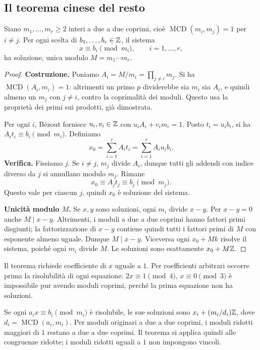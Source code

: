 \subsection{Il teorema cinese del resto}
\begin{teorema}\label{teo:cinese}
Siano $m_1,\ldots,m_r\ge2$ interi a due a due coprimi, cioè $\operatorname{MCD}(m_i,m_j)=1$ per $i\ne j$. Per ogni scelta di $b_1,\ldots,b_r\in\mathbb{Z}$, il sistema
\[
x\equiv b_i\pmod{m_i},\qquad i=1,\ldots,r,
\]
ha soluzione, unica modulo $M=m_1\cdots m_r$.
\end{teorema}
\begin{proof}
\textbf{Costruzione.} Poniamo $A_i=M/m_i=\prod_{j\ne i}m_j$. Si ha $\operatorname{MCD}(A_i,m_i)=1$: altrimenti un primo $p$ dividerebbe sia $m_i$ sia $A_i$, e quindi almeno un $m_j$ con $j\ne i$, contro la coprimalità dei moduli. Questo usa la proprietà dei primi sui prodotti, già dimostrata.

Per ogni $i$, Bézout fornisce $u_i,v_i\in\mathbb{Z}$ con $u_iA_i+v_im_i=1$. Posto $t_i=u_ib_i$, si ha $A_it_i\equiv b_i\pmod{m_i}$. Definiamo
\[
x_0=\sum_{i=1}^r A_it_i=\sum_{i=1}^r A_iu_ib_i.
\]
\textbf{Verifica.} Fissiamo $j$. Se $i\ne j$, $m_j$ divide $A_i$, dunque tutti gli addendi con indice diverso da $j$ si annullano modulo $m_j$. Rimane
\[
x_0\equiv A_jt_j\equiv b_j\pmod{m_j}.
\]
Questo vale per ciascun $j$, quindi $x_0$ è soluzione del sistema.

\textbf{Unicità modulo $M$.} Se $x,y$ sono soluzioni, ogni $m_i$ divide $x-y$. Per $x-y=0$ anche $M\mid x-y$. Altrimenti, i moduli a due a due coprimi hanno fattori primi disgiunti; la fattorizzazione di $x-y$ contiene quindi tutti i fattori primi di $M$ con esponente almeno uguale. Dunque $M\mid x-y$. Viceversa ogni $x_0+Mk$ risolve il sistema, poiché ogni $m_i$ divide $M$. Le soluzioni sono esattamente $x_0+M\mathbb{Z}$.
\end{proof}

\begin{osservazione}
Il teorema richiede coefficiente di $x$ uguale a $1$. Per coefficienti arbitrari occorre prima la risolubilità di ogni equazione: $2x\equiv1\pmod4$, $x\equiv0\pmod3$ è impossibile pur avendo moduli coprimi, perché la prima equazione non ha soluzioni.

Se ogni $a_ix\equiv b_i\pmod{m_i}$ è risolubile, le sue soluzioni sono $x_i+(m_i/d_i)\mathbb{Z}$, dove $d_i=\operatorname{MCD}(a_i,m_i)$. Per moduli originari a due a due coprimi, i moduli ridotti maggiori di $1$ restano a due a due coprimi. Il teorema si applica quindi alle congruenze ridotte; i moduli ridotti uguali a $1$ non impongono vincoli.
\end{osservazione}

